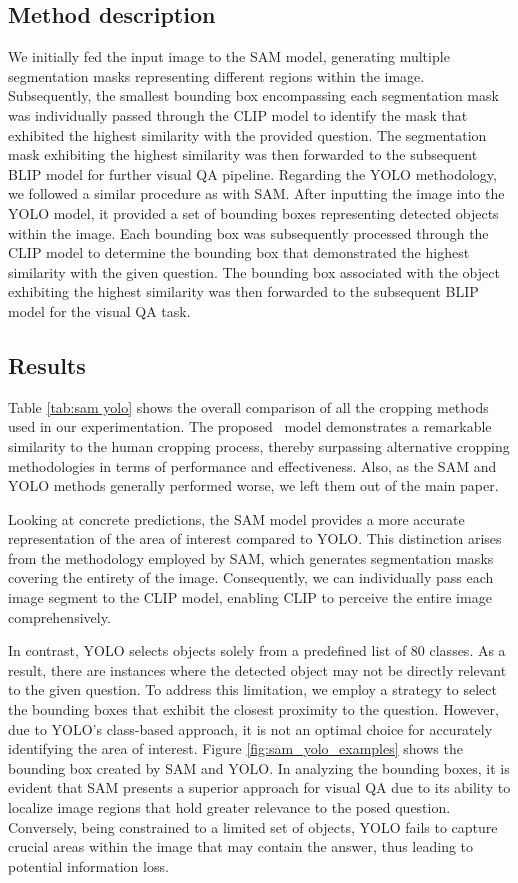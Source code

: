 \subsection{Method description}
We initially fed the input image to the SAM model, generating multiple segmentation masks representing different regions within the image. Subsequently, the smallest bounding box encompassing each segmentation mask was individually passed through the CLIP model to identify the mask that exhibited the highest similarity with the provided question. The segmentation mask exhibiting the highest similarity was then forwarded to the subsequent BLIP model for further visual QA pipeline.
Regarding the YOLO methodology, we followed a similar procedure as with SAM. After inputting the image into the YOLO model, it provided a set of bounding boxes representing detected objects within the image. Each bounding box was subsequently processed through the CLIP model to determine the bounding box that demonstrated the highest similarity with the given question. The bounding box associated with the object exhibiting the highest similarity was then forwarded to the subsequent BLIP model for the visual QA task.

\subsection{Results}
Table \ref{tab:sam yolo} shows the overall comparison of all the cropping methods used in our experimentation. The proposed \grad~model demonstrates a remarkable similarity to the human cropping process, thereby surpassing alternative cropping methodologies in terms of performance and effectiveness. Also, as the SAM and YOLO methods generally performed worse, we left them out of the main paper.

Looking at concrete predictions, the SAM model provides a more accurate representation of the area of interest compared to YOLO. This distinction arises from the methodology employed by SAM, which generates segmentation masks covering the entirety of the image. Consequently, we can individually pass each image segment to the CLIP model, enabling CLIP to perceive the entire image comprehensively.

In contrast, YOLO selects objects solely from a predefined list of 80 classes. As a result, there are instances where the detected object may not be directly relevant to the given question. To address this limitation, we employ a strategy to select the bounding boxes that exhibit the closest proximity to the question. However, due to YOLO's class-based approach, it is not an optimal choice for accurately identifying the area of interest. Figure \ref{fig:sam_yolo_examples} shows the bounding box created by SAM and YOLO. In analyzing the bounding boxes, it is evident that SAM presents a superior approach for visual QA due to its ability to localize image regions that hold greater relevance to the posed question. Conversely, being constrained to a limited set of objects, YOLO fails to capture crucial areas within the image that may contain the answer, thus leading to potential information loss.



